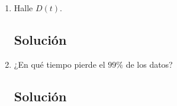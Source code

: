 \begin{enumerate}[label=\arabic*., leftmargin=*]
\begin{enumerate}[label=(\alph*), leftmargin=*]
        \subsection*{Solución}

        \item Halle $D(t)$.
        \subsection*{Solución}

        \item ¿En qué tiempo pierde el $99\%$ de los datos?
        \subsection*{Solución}
    \end{enumerate}
\end{enumerate}
